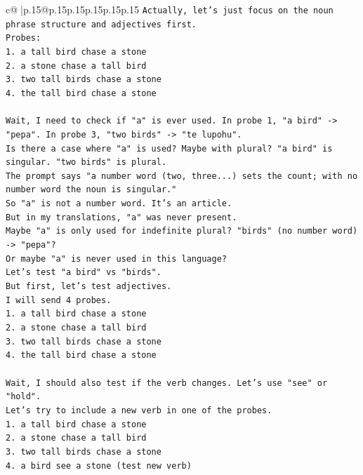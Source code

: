 \documentclass{article}
\begin{document}
{\begin{supertabular}{c@{$\;$}|p{.15\linewidth}@{}p{.15\linewidth}p{.15\linewidth}p{.15\linewidth}p{.15\linewidth}p{.15\linewidth}}
{{{\texttt{Actually, let's just focus on the noun phrase structure and adjectives first.} \\
\texttt{Probes:} \\
\texttt{1. a tall bird chase a stone} \\
\texttt{2. a stone chase a tall bird} \\
\texttt{3. two tall birds chase a stone} \\
\texttt{4. the tall bird chase a stone} \\
\\ 
\texttt{Wait, I need to check if "a" is ever used. In probe 1, "a bird" {-}> "pepa". In probe 3, "two birds" {-}> "te lupohu".} \\
\texttt{Is there a case where "a" is used? Maybe with plural? "a bird" is singular. "two birds" is plural.} \\
\texttt{The prompt says "a number word (two, three...) sets the count; with no number word the noun is singular."} \\
\texttt{So "a" is not a number word. It's an article.} \\
\texttt{But in my translations, "a" was never present.} \\
\texttt{Maybe "a" is only used for indefinite plural? "birds" (no number word) {-}> "pepa"?} \\
\texttt{Or maybe "a" is never used in this language?} \\
\texttt{Let's test "a bird" vs "birds".} \\
\texttt{But first, let's test adjectives.} \\
\texttt{I will send 4 probes.} \\
\texttt{1. a tall bird chase a stone} \\
\texttt{2. a stone chase a tall bird} \\
\texttt{3. two tall birds chase a stone} \\
\texttt{4. the tall bird chase a stone} \\
\\ 
\texttt{Wait, I should also test if the verb changes. Let's use "see" or "hold".} \\
\texttt{Let's try to include a new verb in one of the probes.} \\
\texttt{1. a tall bird chase a stone} \\
\texttt{2. a stone chase a tall bird} \\
\texttt{3. two tall birds chase a stone} \\
\texttt{4. a bird see a stone (test new verb)} \\
}}}
\end{supertabular}}
\end{document}

